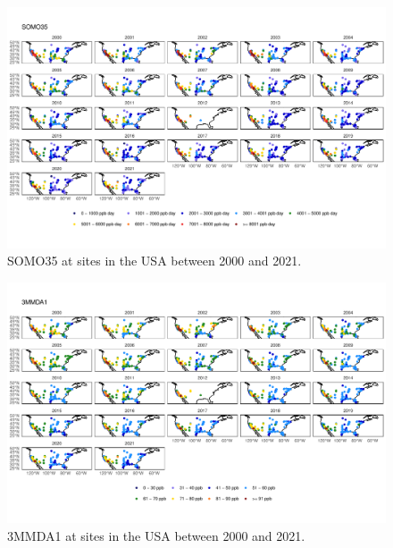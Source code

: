 \documentclass{article}
\begin{document}
\begin{figure}
\centering
\includegraphics[height=0.75\textheight]{figures/si_figures/fS18_metric_map_United-States-of-America_SOMO35.pdf}
\caption{SOMO35 at sites in the USA between 2000 and 2021.}
\label{si_fig:metric_map_us_SOMO35}
\end{figure}
\clearpage

\begin{figure}
\centering
\includegraphics[height=0.75\textheight]{figures/si_figures/fS19_metric_map_United-States-of-America_3MMDA1.pdf}
\caption{3MMDA1 at sites in the USA between 2000 and 2021.}
\label{si_fig:metric_map_us_3MMDA1}
\end{figure}
\clearpage
\end{document}
